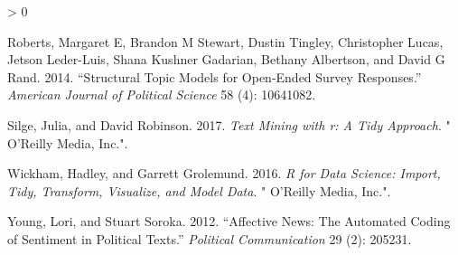 \documentclass[
]{book}
\newlength{\cslhangindent}
\newenvironment{CSLReferences}[2] %
 {%
  \setlength{\parindent}{0pt}
  \ifodd #1 \everypar{\setlength{\hangindent}{\cslhangindent}}\ignorespaces\fi
  \ifnum #2 > 0
  \setlength{\parskip}{#2\baselineskip}
  \fi
 }%
 {}
\begin{document}
\begin{CSLReferences}{1}{0}
\leavevmode\hypertarget{ref-roberts2014structural}{}%
Roberts, Margaret E, Brandon M Stewart, Dustin Tingley, Christopher
Lucas, Jetson Leder-Luis, Shana Kushner Gadarian, Bethany Albertson, and
David G Rand. 2014. {``Structural Topic Models for Open-Ended Survey
Responses.''} \emph{American Journal of Political Science} 58 (4):
10641082.

\leavevmode\hypertarget{ref-silge2017text}{}%
Silge, Julia, and David Robinson. 2017. \emph{Text Mining with r: A Tidy
Approach}. {"} O'Reilly Media, Inc.{"}.

\leavevmode\hypertarget{ref-wickham2016r}{}%
Wickham, Hadley, and Garrett Grolemund. 2016. \emph{R for Data Science:
Import, Tidy, Transform, Visualize, and Model Data}. {"} O'Reilly Media,
Inc.{"}.

\leavevmode\hypertarget{ref-young2012affective}{}%
Young, Lori, and Stuart Soroka. 2012. {``Affective News: The Automated
Coding of Sentiment in Political Texts.''} \emph{Political
Communication} 29 (2): 205231.

\end{CSLReferences}

\backmatter
\end{document}

